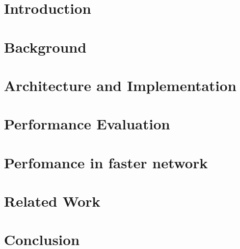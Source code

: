 
\graphicspath{{Manuscript/}}

\chapter{Introduction}


\chapter{Background}\label{chapter:Background}


\chapter{Architecture and Implementation}\label{chapter:Architecture and Implementation}



\chapter{Performance Evaluation}\label{chapter:Performance Evaluation}


\chapter{Perfomance in faster network}\label{chapter:Further Improvement}


\chapter{Related Work}\label{chapter:Related Work}


\chapter{Conclusion}\label{chapter:Conclusion and future work}


%



